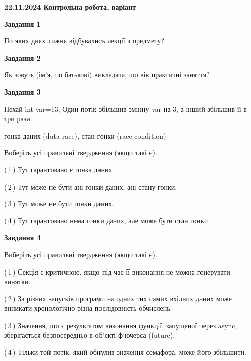\documentclass[12pt, ukrainian]{article}
\begin{document}
\begin {large}

\textbf{22.11.2024 Контрольна робота, варіант  }\par


{

\begin{center}
\textbf{Завдання 1}
\end{center}

По яких днях тижня відбувались лекції з предмету?


\begin{center}
\textbf{Завдання 2}
\end{center}

Як зовуть (ім'я, по батькові) викладача, що вів практичні заняття?


\begin{center}
\textbf{Завдання 3}
\end{center}

Нехай int var=13; Один потік збільшив змінну var на 3, а інший збільшив її в три рази.

гонка даних (data race), стан гонки (race condition)

Виберіть усі правильні твердження (якщо такі є).\par
\vspace{2mm}
(\,1\,) Тут гарантовано є гонка даних.%

(\,2\,) Тут може не бути ані гонки даних, ані стану гонки.%

(\,3\,) Тут може не бути гонки даних.%

(\,4\,) Тут гарантовано нема гонки даних, але може бути стан гонки.%


\begin{center}
\textbf{Завдання 4}
\end{center}

Виберіть усі правильні твердження (якщо такі є).\par
\vspace{2mm}

(\,1\,) Секція є критичною, якщо під час її виконання не можна генерувати винятки.%

(\,2\,) За різних запусків програми на одних тих самих вхідних даних може виникати хронологічно різна послідовність обчислень.%

(\,3\,) Значення, що є результатом виконання функції, запущеної через async, зберігається безпосередньо в об’єкті ф’ючерса (future).%

(\,4\,) Тільки той потік, який обнулив значення семафора, може його збільшити.%


}
\end{large}
\end{document}
